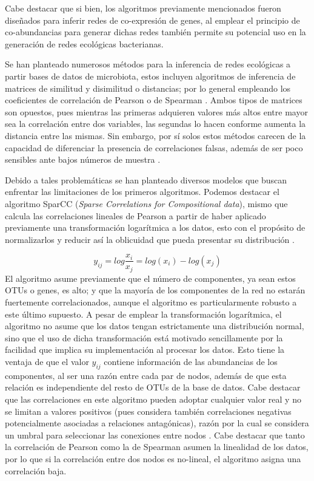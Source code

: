 \documentclass[
]{book}
\begin{document}
Cabe destacar que si bien, los algoritmos previamente mencionados fueron diseñados para inferir redes de co-expresión de genes, al emplear el principio de co-abundancias para generar dichas redes también permite su potencial uso en la generación de redes ecológicas bacterianas.

Se han planteado numerosos métodos para la inferencia de redes ecológicas a partir bases de datos de microbiota, estos incluyen algoritmos de inferencia de matrices de similitud y disimilitud o distancias; por lo general empleando los coeficientes de correlación de Pearson o de Spearman \citep{chen2016two}. Ambos tipos de matrices son opuestos, pues mientras las primeras adquieren valores más altos entre mayor sea la correlación entre dos variables, las segundas lo hacen conforme aumenta la distancia entre las mismas. Sin embargo, por sí solos estos métodos carecen de la capacidad de diferenciar la presencia de correlaciones falsas, además de ser poco sensibles ante bajos números de muestra \citep{layeghifard2017disentangling}.

Debido a tales problemáticas se han planteado diversos modelos que buscan enfrentar las limitaciones de los primeros algoritmos. Podemos destacar el algoritmo SparCC (\emph{Sparse Correlations for Compositional data}), mismo que calcula las correlaciones lineales de Pearson a partir de haber aplicado previamente una transformación logarítmica a los datos, esto con el propósito de normalizarlos y reducir así la oblicuidad que pueda presentar su distribución \citep{friedman2012inferring}.

\[y_{ij} = log\frac{x_{i}}{x_{j}} = log(x_{i}) - log(x_{j})\]
El algoritmo asume previamente que el número de componentes, ya sean estos OTUs o genes, es alto; y que la mayoría de los componentes de la red no estarán fuertemente correlacionados, aunque el algoritmo es particularmente robusto a este último supuesto. A pesar de emplear la transformación logarítmica, el algoritmo no asume que los datos tengan estrictamente una distribución normal, sino que el uso de dicha transformación está motivado sencillamente por la facilidad que implica su implementación al procesar los datos. Esto tiene la ventaja de que el valor \(y_{ij}\) contiene información de las abundancias de los componentes, al ser una razón entre cada par de nodos, además de que esta relación es independiente del resto de OTUs de la base de datos. Cabe destacar que las correlaciones en este algoritmo pueden adoptar cualquier valor real y no se limitan a valores positivos (pues considera también correlaciones negativas potencialmente asociadas a relaciones antagónicas), razón por la cual se considera un umbral para seleccionar las conexiones entre nodos \citep{friedman2012inferring}. Cabe destacar que tanto la correlación de Pearson como la de Spearman asumen la linealidad de los datos, por lo que si la correlación entre dos nodos es no-lineal, el algoritmo asigna una correlación baja.
\end{document}
